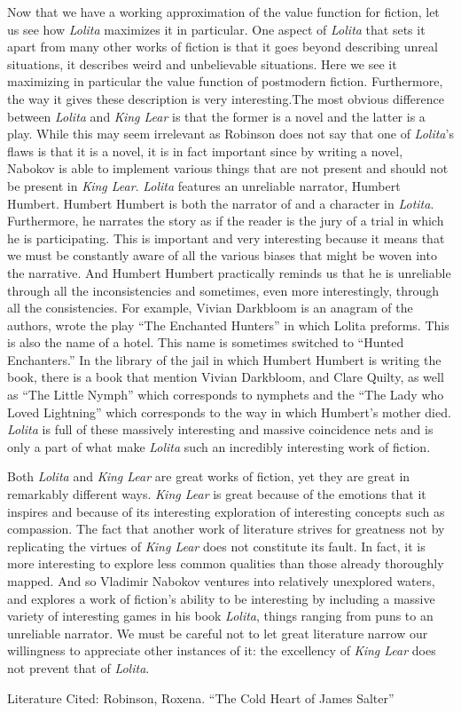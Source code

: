 \documentclass[12pt]{article}
\begin{document}
Now that we have a working approximation of the value function for fiction, let us see how \textit{Lolita} maximizes it in particular. One aspect of \textit{Lolita} that sets it apart from many other works of fiction is that it goes beyond describing unreal situations, it describes weird and unbelievable situations. Here we see it maximizing in particular the value function of postmodern fiction. Furthermore, the way it gives these description is very interesting.The most obvious difference between \textit{Lolita} and \textit{King Lear} is that the former is a novel and the latter is a play. While this may seem irrelevant as Robinson does not say that one of \textit{Lolita}'s flaws is that it is a novel, it is in fact important since by writing a novel, Nabokov is able to implement various things that are not present and should not be present in \textit{King Lear}. \textit{Lolita} features an unreliable narrator, Humbert Humbert. Humbert Humbert is both the narrator of and a character in \textit{Lotita}. Furthermore, he narrates the story as if the reader is the jury of a trial in which he is participating. This is important and very interesting because it means that we must be constantly aware of all the various biases that might be woven into the narrative. And Humbert Humbert practically reminds us that he is unreliable through all the inconsistencies and sometimes, even more interestingly, through all the consistencies. For example, Vivian Darkbloom is an anagram of the authors, wrote the play ``The Enchanted Hunters'' in which Lolita preforms. This is also the name of a hotel. This name is sometimes switched to ``Hunted Enchanters.'' In the library of the jail in which Humbert Humbert is writing the book, there is a book that mention Vivian Darkbloom, and Clare Quilty, as well as ``The Little Nymph'' which corresponds to nymphets and the ``The Lady who Loved Lightning'' which corresponds to the way in which Humbert's mother died. \textit{Lolita} is full of these massively interesting and massive coincidence nets and is only a part of what make \textit{Lolita} such an incredibly interesting work of fiction.

Both \textit{Lolita} and \textit{King Lear} are great works of fiction, yet they are great in remarkably different ways. \textit{King Lear} is great because of the emotions that it inspires and because of its interesting exploration of interesting concepts such as compassion. The fact that another work of literature strives for greatness not by replicating the virtues of \textit{King Lear} does not constitute its fault. In fact, it is more interesting to explore less common qualities than those already thoroughly mapped. And so Vladimir Nabokov ventures into relatively unexplored waters, and explores a work of fiction's ability to be interesting by including a massive variety of interesting games in his book \textit{Lolita}, things ranging from puns to an unreliable narrator. We must be careful not to let great literature narrow our willingness to appreciate other instances of it: the excellency of \textit{King Lear} does not prevent that of \textit{Lolita}.

\newpage
Literature Cited: \newline
Robinson, Roxena. ``The Cold Heart of James Salter''
\end{document}
